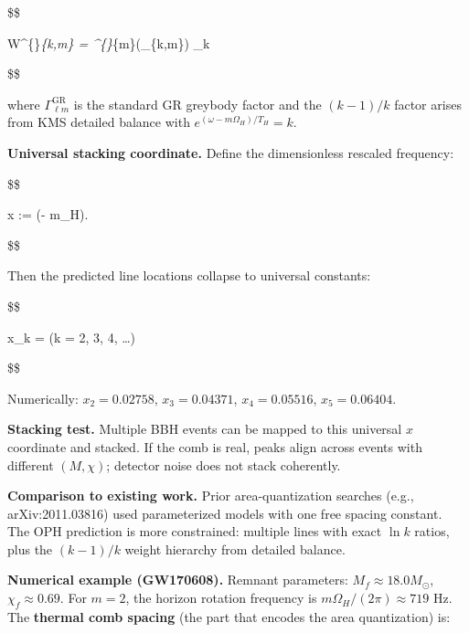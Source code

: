 \documentclass[11pt,a4paper]{article}
\theoremstyle{remark}
\begin{document}
\$\$

W\^{}\{\}\emph{\{k,\ell m\} = \Gamma\^{}\{\}}\{\ell m\}(\omega\_\{k,m\}) \cdot \Delta\omega\_k \cdot {}

\$\$

where \(\Gamma^{\mathrm{GR}}_{\ell m}\) is the standard GR greybody factor and the
\((k-1)/k\) factor arises from KMS detailed balance with \(e^{(\omega-m\Omega_H)/T_H} = k\).

\textbf{Universal stacking coordinate.} Define the dimensionless rescaled frequency:

\$\$

x := (\omega - m\Omega\_H).

\$\$

Then the predicted line locations collapse to universal constants:

\$\$

x\_k =  \qquad (k = 2, 3, 4, \ldots)

\$\$

Numerically: \(x_2 = 0.02758\), \(x_3 = 0.04371\), \(x_4 = 0.05516\), \(x_5 = 0.06404\).

\textbf{Stacking test.} Multiple BBH events can be mapped to this universal \(x\)
coordinate and stacked. If the comb is real, peaks align across events with
different \((M, \chi)\); detector noise does not stack coherently.

\textbf{Comparison to existing work.} Prior area-quantization searches (e.g.,
arXiv:2011.03816) used parameterized models with one free spacing constant.
The OPH prediction is more constrained: multiple lines with exact \(\ln k\)
ratios, plus the \((k-1)/k\) weight hierarchy from detailed balance.

\textbf{Numerical example (GW170608).} Remnant parameters: \(M_f \approx 18.0 M_\odot\),
\(\chi_f \approx 0.69\). For \(m = 2\), the horizon rotation frequency is
\(m\Omega_H/(2\pi) \approx 719\) Hz. The \textbf{thermal comb spacing} (the part
that encodes the area quantization) is:
\end{document}
